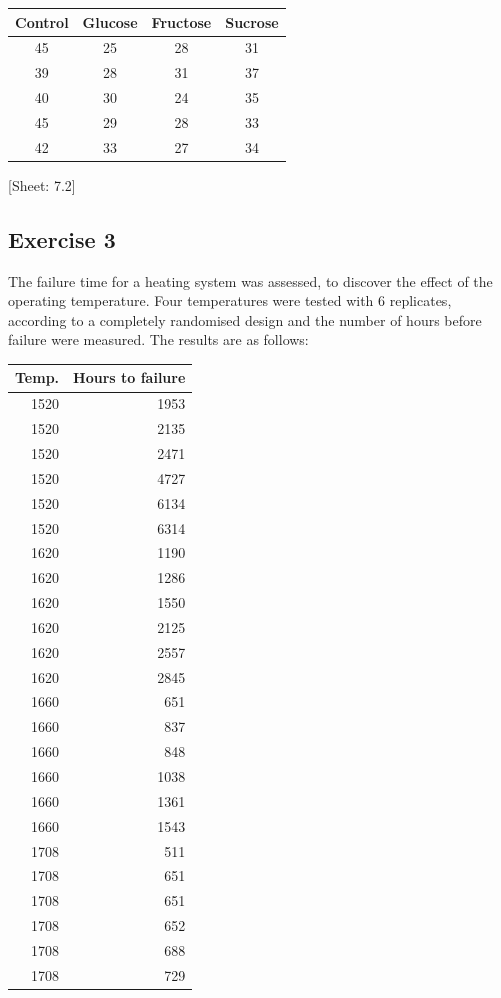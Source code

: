 \documentclass[a4paper,12pt,oneside]{book}
\begin{document}
\begin{longtable}[]{@{}cccc@{}}
\toprule()
Control & Glucose & Fructose & Sucrose \\
\midrule()
\endhead
45 & 25 & 28 & 31 \\
39 & 28 & 31 & 37 \\
40 & 30 & 24 & 35 \\
45 & 29 & 28 & 33 \\
42 & 33 & 27 & 34 \\
\bottomrule()
\end{longtable}

{[}Sheet: 7.2{]}

\hypertarget{exercise-3-5}{%
\subsection{Exercise 3}\label{exercise-3-5}}

The failure time for a heating system was assessed, to discover the effect of the operating temperature. Four temperatures were tested with 6 replicates, according to a completely randomised design and the number of hours before failure were measured.
The results are as follows:

\begin{longtable}[]{@{}rr@{}}
\toprule()
Temp. & Hours to failure \\
\midrule()
\endhead
1520 & 1953 \\
1520 & 2135 \\
1520 & 2471 \\
1520 & 4727 \\
1520 & 6134 \\
1520 & 6314 \\
1620 & 1190 \\
1620 & 1286 \\
1620 & 1550 \\
1620 & 2125 \\
1620 & 2557 \\
1620 & 2845 \\
1660 & 651 \\
1660 & 837 \\
1660 & 848 \\
1660 & 1038 \\
1660 & 1361 \\
1660 & 1543 \\
1708 & 511 \\
1708 & 651 \\
1708 & 651 \\
1708 & 652 \\
1708 & 688 \\
1708 & 729 \\
\bottomrule()
\end{longtable}
\end{document}
